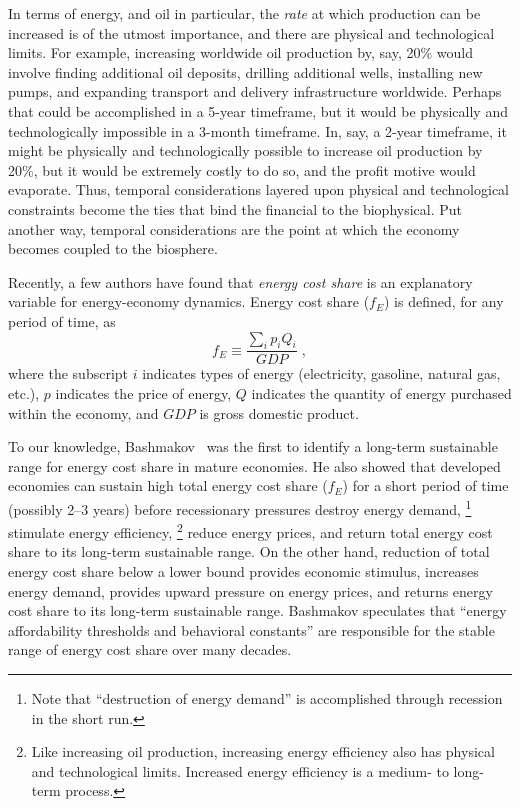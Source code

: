 In terms of energy, and oil in particular, 
the \emph{rate} at which production can be increased 
is of the utmost importance, and
there are physical and technological limits. 
For example, increasing worldwide oil production by, say, 20\% would involve
finding additional oil deposits, drilling additional wells, installing new pumps,
and expanding transport and delivery infrastructure worldwide.
Perhaps that could be accomplished in a 5-year timeframe, 
but it would be physically and technologically impossible in a 3-month timeframe.
In, say, a 2-year timeframe, it might be physically and technologically possible
to increase oil production by 20\%, 
but it would be extremely costly to do so,
and the profit motive would evaporate.
Thus, temporal considerations 
layered upon physical and technological constraints 
become the ties that bind the financial to the biophysical.
Put another way, temporal considerations are the point at which the economy 
becomes coupled to the biosphere.


Recently, a few authors have found that \emph{energy cost share} 
is an explanatory variable for energy-economy dynamics.
Energy cost share ($f_E$) is defined, for any period of time, as
%
\begin{equation}
	f_E \equiv \frac{\displaystyle\sum_i p_i Q_i}{GDP} \; ,
\end{equation}
%
where 
the subscript $i$ indicates types of energy 
(electricity, gasoline, natural gas, etc.),
$p$ indicates the price of energy,
$Q$ indicates the quantity of energy purchased within the economy, and
$GDP$ is gross domestic product.

To our knowledge, 
Bashmakov~\cite{Bashmakov:2007ek} was the first to 
identify a long-term sustainable range for energy cost share
in mature economies.
He also showed that developed economies 
can sustain high total energy cost share ($f_E$) 
for a short period of time 
(possibly 2--3 years) 
before recessionary pressures 
destroy energy demand,%
	\footnote{
	Note that ``destruction of energy demand'' 
	is accomplished through recession
	in the short run.
	}
stimulate energy efficiency,%
	\footnote{
	Like increasing oil production, 
	increasing energy efficiency also has 
	physical and technological limits.
	Increased energy efficiency is a medium- to long-term process. 
	}
reduce energy prices, 
and return total energy cost share to its long-term sustainable range.
On the other hand, reduction of total energy cost share below 
a lower bound provides economic stimulus, 
increases energy demand, 
provides upward pressure on energy prices, 
and returns energy cost share to its long-term sustainable range.
Bashmakov speculates that 
``energy affordability thresholds and behavioral constants'' 
are responsible for the stable range of energy cost share 
over many decades.\cite[p.~3585]{Bashmakov:2007ek} 
 
